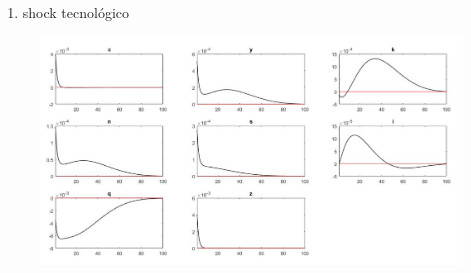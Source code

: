 \documentclass{article}
\begin{document}
\newpage
\begin{enumerate}
\item shock tecnológico	
	\end{enumerate}

\begin{figure}[h!]
	\centering
	\includegraphics[width=1.2\linewidth]{shocktec}
	\label{fig:w3}
\end{figure}
\end{document}
